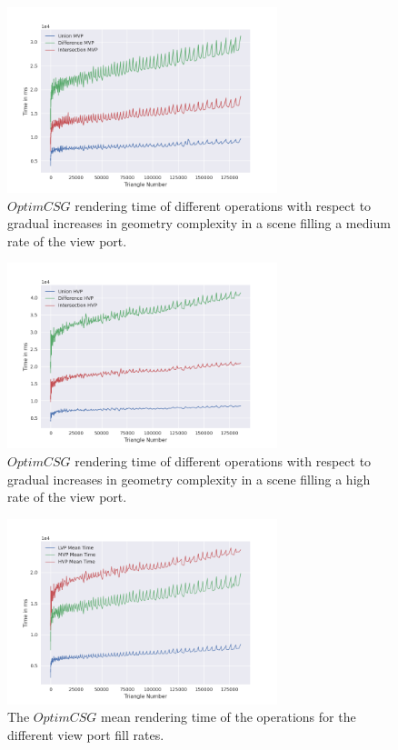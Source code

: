 \documentclass[a4paper,11pt,oneside]{article}
\begin{document}
\begin{figure}[H]
	\centering
	\includegraphics[width=0.7\textwidth]{section5/plots/optim_csg_mvp.png}
	\caption{$OptimCSG$ rendering time of different operations with respect to gradual increases in geometry complexity in a scene filling a medium rate of the view port.}
	\label{sec5.1:optim_operations_mvp}
\end{figure}

\begin{figure}[H]
	\centering
	\includegraphics[width=0.7\textwidth]{section5/plots/optim_csg_hvp.png}
	\caption{$OptimCSG$ rendering time of different operations with respect to gradual increases in geometry complexity in a scene filling a high rate of the view port.}
	\label{sec5.1:optim_operations_hvp}
\end{figure}
\begin{figure}[H]
	\centering
	\includegraphics[width=0.7\textwidth]{section5/plots/optim_csg_mean.png}
	\caption{The $OptimCSG$ mean rendering time of the operations for the different view port fill rates.}
	\label{sec5.1:bin_operations}
\end{figure}
\end{document}
